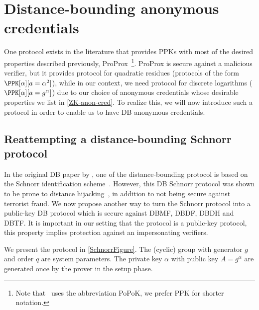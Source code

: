 \section{Distance-bounding anonymous credentials}%
\label{DB-anon-cred}

One protocol exists in the literature that provides \acp{PPK} with most of the 
desired properties described previously, ProProx~\cite{ProProx}\footnote{Note 
  that~\cite{ProProx} uses the abbreviation PoPoK, we prefer \acs{PPK} for 
  shorter notation.}.
ProProx is secure against a malicious verifier, but it provides  
protocol for quadratic residues (\ie protocols of the form \(\PPK[\alpha][a = 
  \alpha^2]\)), while in our context, we need  protocol for discrete 
logarithms (\ie \(\PPK[\alpha][a = g^\alpha]\)) due to our choice of 
anonymous credentials whose desirable properties we list in
\cref{ZK-anon-cred}.%
To realize this, we will now introduce such a protocol in order to enable us to have \ac{DB} anonymous credentials.

\subsection{Reattempting a distance-bounding Schnorr protocol}%
\label{DBSchnorr}

In the original \ac{DB} paper by \citet{DistanceBounding}, one of the distance-bounding protocol is based on the Schnorr identification scheme~\cite{Schnorr}.
However, this \ac{DB} Schnorr protocol was shown to be prone to distance hijacking~\cite{DistanceHijacking, TamarinDB}, in addition to not being secure against terrorist fraud.
We now propose another way to turn the Schnorr protocol into a
public-key \ac{DB} protocol which is secure against \ac{DBMF},
\ac{DBDF}, \ac{DBDH} and \ac{DBTF}.
It is important in our setting that the protocol is a public-key protocol, this 
property implies protection against an impersonating verifiers.

We present the protocol in \cref{SchnorrFigure}.
The (cyclic) group with generator \(g\) and order \(q\) are system parameters.
The private key \(\alpha\) with public key \(A = g^\alpha\) are generated once 
by the prover in the setup phase.

